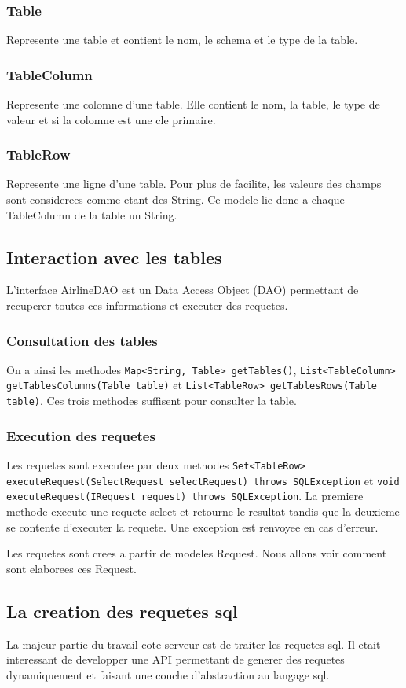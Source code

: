 \subsubsection{Table}
Represente une table et contient le nom, le schema et le type de la table.
\subsubsection{TableColumn}
Represente une colomne d'une table. Elle contient le nom, la table, le type de valeur et si la colomne est une cle primaire.
\subsubsection{TableRow}
Represente une ligne d'une table. Pour plus de facilite, les valeurs des champs sont considerees comme etant des String. Ce modele lie donc a chaque TableColumn de la table un String.
\subsection{Interaction avec les tables}
L'interface AirlineDAO est un Data Access Object (DAO) permettant de recuperer toutes ces informations et executer des requetes. 
\subsubsection{Consultation des tables}
On a ainsi les methodes \texttt{Map<String, Table> getTables()}, \texttt{List<TableColumn> getTablesColumns(Table table)} et \texttt{List<TableRow> getTablesRows(Table table)}. Ces trois methodes suffisent pour consulter la table.
\subsubsection{Execution des requetes}
Les requetes sont executee par deux methodes \texttt{Set<TableRow> executeRequest(SelectRequest selectRequest) throws SQLException} et \texttt{void executeRequest(IRequest request) throws SQLException}. La premiere methode execute une requete select et retourne le resultat tandis que la deuxieme se contente d'executer la requete. Une exception est renvoyee en cas d'erreur.

Les requetes sont crees a partir de modeles Request. Nous allons voir comment sont elaborees ces Request.
\subsection{La creation des requetes sql}
La majeur partie du travail cote serveur est de traiter les requetes sql. Il etait interessant de developper une API permettant de generer des requetes dynamiquement et faisant une couche d'abstraction au langage sql.

